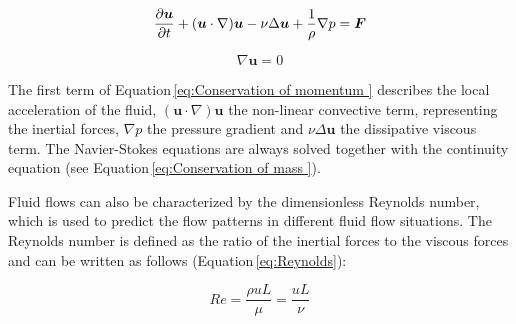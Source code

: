 \begin{equation}
{\partial{\boldsymbol u}\over{\partial t}} + ({\boldsymbol u} \cdot \nabla) {\boldsymbol u} - \nu\Delta{\boldsymbol u}+ \frac{1}{\rho}\nabla p = {\boldsymbol F}
\label{eq:Conservation of momentum }
\end{equation}

\begin{equation}
\nabla{\boldsymbol u} = 0
\label{eq:Conservation of mass }
\end{equation}
 
The first term of Equation\,\ref{eq:Conservation of momentum } describes the local acceleration of the fluid, $({\boldsymbol u} \cdot \nabla) {\boldsymbol u}$ the non-linear convective term, representing the inertial forces, $\nabla p$ the pressure gradient and $\nu\Delta{\boldsymbol u}$ the dissipative viscous term. The Navier-Stokes equations are always solved together with the continuity equation (see Equation\,\ref{eq:Conservation of mass }).
 
Fluid flows can also be characterized by the dimensionless Reynolds number, which is used to predict the flow patterns in different fluid flow situations. The Reynolds number is defined as the ratio of the inertial forces to the viscous forces and can be written as follows (Equation\,\ref{eq:Reynolds}):  

\begin{equation}
Re=\frac{\rho u L}{\mu}=\frac{uL}{\nu}
\label{eq:Reynolds}
\end{equation}

